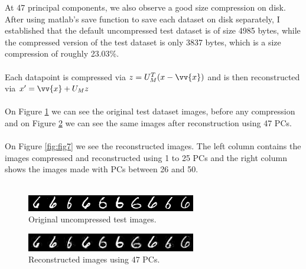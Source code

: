 \documentclass[a4paper,11pt,twocolumn]{article}
\begin{document}
At 47 principal components, we also observe a good size compression on disk. After using matlab's save function to save each dataset on disk separately, I established that the default uncompressed test dataset is of size 4985 bytes, while the compressed version of the test dataset is only 3837 bytes, which is a size compression of roughly 23.03\%.
\\\\Each datapoint is compressed via $z = U^{T}_{M}(x - \vv{x})$ and is then reconstructed via $x' = \vv{x} + U_{M}z$
\\\\On Figure \ref{fig:fig5} we can see the original test dataset images, before any compression and on Figure \ref{fig:fig6} we can see the same images after reconstruction using 47 PCs.
\\\\On Figure \ref{fig:fig7} we see the reconstructed images. The left column contains the images compressed and reconstructed using 1 to 25 PCs and the right column shows the images made with PCs between 26 and 50.\\\\ 

\begin{figure}[!h]
  \centering
  \includegraphics[width=\linewidth]{img/original.png}
  \caption{Original uncompressed test images.}
  \label{fig:fig5}
\end{figure}

\begin{figure}[!h]
  \centering
  \includegraphics[width=\linewidth]{img/47pcs.png}
  \caption{Reconstructed images using 47 PCs.}
  \label{fig:fig6}
\end{figure}
\end{document}

